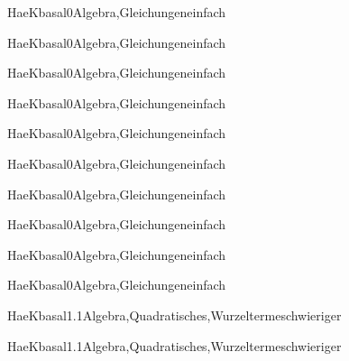 \documentclass[12pt]{article}
\begin{document}
\begin{Add}{HaeK}{basal0}{Algebra,Gleichungen}{einfach}
\solution{ }
\end{Add}
\begin{Add}{HaeK}{basal0}{Algebra,Gleichungen}{einfach}
\end{Add}

\begin{Add}{HaeK}{basal0}{Algebra,Gleichungen}{einfach}
\solution{ }
\end{Add}
\begin{Add}{HaeK}{basal0}{Algebra,Gleichungen}{einfach}
\end{Add}

\begin{Add}{HaeK}{basal0}{Algebra,Gleichungen}{einfach}
\solution{ }
\end{Add}
\begin{Add}{HaeK}{basal0}{Algebra,Gleichungen}{einfach}
\end{Add}

\begin{Add}{HaeK}{basal0}{Algebra,Gleichungen}{einfach}
\solution{ }
\end{Add}
\begin{Add}{HaeK}{basal0}{Algebra,Gleichungen}{einfach}
\end{Add}

\begin{Add}{HaeK}{basal0}{Algebra,Gleichungen}{einfach}
\solution{ }
\end{Add}
\begin{Add}{HaeK}{basal0}{Algebra,Gleichungen}{einfach}
\end{Add}

\begin{Add}{HaeK}{basal1.1}{Algebra,Quadratisches,Wurzelterme}{schwieriger}
\solution{ }
\end{Add}
\begin{Add}{HaeK}{basal1.1}{Algebra,Quadratisches,Wurzelterme}{schwieriger}
\end{Add}
\end{document}
